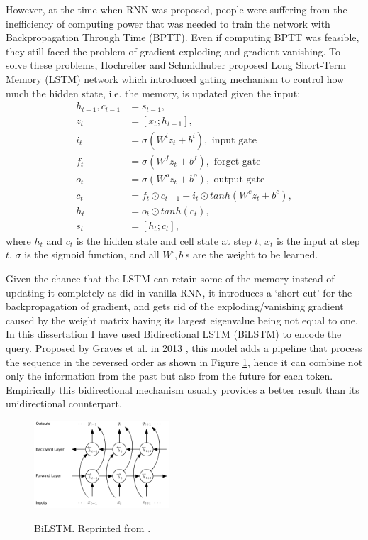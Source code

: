 \documentclass[12pt]{report}
\begin{document}
However, at the time when RNN was proposed, people were suffering from the inefficiency of computing power that was needed to train the network with Backpropagation Through Time (BPTT). Even if computing BPTT was feasible, they still faced the problem of gradient exploding and gradient vanishing. To solve these problems, Hochreiter and Schmidhuber proposed Long Short-Term Memory (LSTM) network which introduced gating mechanism to control how much the hidden state, i.e. the memory, is updated given the input:
\begin{align*}
h_{t-1}, c_{t-1} &= s_{t-1},\\
z_t &= [x_t; h_{t-1}],\\
i_t &= \sigma(W^iz_t+b^i), \text{ input gate}\\
f_t &= \sigma(W^fz_t+b^f), \text{ forget gate}\\
o_t &= \sigma(W^oz_t+b^o), \text{ output gate}\\
c_t &= f_t \odot c_{t-1} + i_t \odot tanh(W^cz_t+b^c),\\
h_t &= o_t \odot tanh(c_t),\\
s_t &= [h_t; c_t],
\end{align*}
where $h_t$ and $c_t$ is the hidden state and cell state at step $t$, $x_t$ is the input at step $t$, $\sigma$ is the sigmoid function, and all $W^\cdot, b^\cdot$s are the weight to be learned.

Given the chance that the LSTM can retain some of the memory instead of updating it completely as did in vanilla RNN, it introduces a `short-cut' for the backpropagation of gradient, and gets rid of the exploding/vanishing gradient caused by the weight matrix having its largest eigenvalue being not equal to one. In this dissertation I have used Bidirectional LSTM (BiLSTM) to encode the query. Proposed by Graves et al. in 2013 \cite{graves_speech_2013}, this model adds a pipeline that process the sequence in the reversed order as shown in Figure \ref{bilstm}, hence it can combine not only the information from the past but also from the future for each token. Empirically this bidirectional mechanism usually provides a better result than its unidirectional counterpart.
\begin{figure}[H]
\centering
\includegraphics[width=0.45\textwidth]{figures/bilstm.png}
\label{bilstm}
\caption[BiLSTM]{BiLSTM. Reprinted from \cite{graves_speech_2013}.}
\end{figure}
\end{document}
